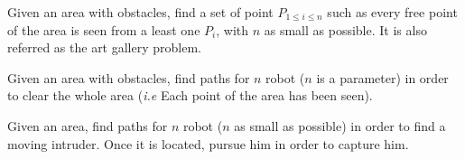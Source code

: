 \begin{problem}
Given an area with obstacles, find a set of point $P_{1\leq i \leq n}$ such as every free point of the area is seen from a least one $P_i$, with $n$ as small as possible. It is also referred as the art gallery problem.
\end{problem}
\begin{problem}
Given an area with obstacles, find paths for $n$ robot ($n$ is a parameter) in order to clear the whole area (\emph{i.e} Each point of the area has been seen).
\end{problem}
\begin{problem}
Given an area, find paths for $n$ robot ($n$ as small as possible) in order to find a moving intruder. Once it is located, pursue him in order to capture him.
\end{problem}